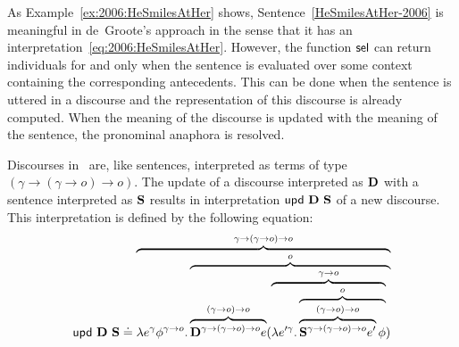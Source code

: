 As Example~\ref{ex:2006:HeSmilesAtHer} shows, Sentence~\eqref{HeSmilesAtHer-2006} is meaningful in de~Groote's approach in the sense that it has an interpretation~\eqref{eq:2006:HeSmilesAtHer}. However, the function $\sel$ can return individuals for  and  only when the sentence is evaluated over some context containing the corresponding antecedents. This can be done when the sentence is uttered in a discourse and the representation of this discourse is already computed. When the meaning of the discourse is updated with the meaning of the sentence, the pronominal anaphora is resolved. 

Discourses in~\cite{deGroote:2006:Towards-a-Montagovian-Account-of-Dynamics} are, like sentences, interpreted as terms of type $(\gamma \rightarrow (\gamma \rightarrow o) \rightarrow o)$.  The update of a discourse interpreted as $\D$ with a sentence interpreted as $\S$ results in interpretation $\updt \ \D \ \S$ of a new discourse. This interpretation is defined by the following equation:
\begin{align}
\updt \ \D \ \S \defeq \overbrace{\lambda e^{\gamma} \phi^{\gamma \rightarrow o}. \overbrace{ \overbrace{\D^{\gamma \rightarrow (\gamma \rightarrow o) \rightarrow o}  e}^{(\gamma \rightarrow o) \rightarrow o} (\overbrace{\lambda e'^{\gamma}. \overbrace{\overbrace{\S^{\gamma \rightarrow (\gamma \rightarrow o) \rightarrow o}  e'}^{ (\gamma \rightarrow o) \rightarrow o} \phi}^{o}}^{\gamma \rightarrow o})}^{o}}^{\gamma \rightarrow (\gamma \rightarrow o) \rightarrow o} \label{eq:updtDS:2006}
\end{align}


